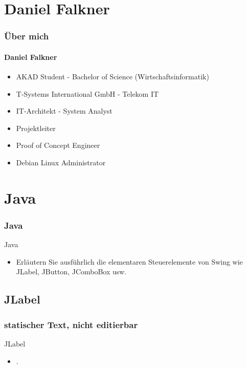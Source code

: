 \documentclass[xcolor=dvipsnames]{beamer}
\subtitle{Modul JAV02} %
\institute{AKAD University} %
\title{\Title}
\author{\Author}
\date{05/06.September.2014}
\begin{document}
\begin{frame}
    \titlepage
\end{frame}


\frame{\tableofcontents[hideothersubsections]} 

\section{Daniel Falkner}
\begin{frame} %
  \frametitle{Über mich} %
  \framesubtitle{Daniel Falkner} %
  \begin{block}{}
	  \begin{itemize}
	  	\item AKAD Student - Bachelor of Science (Wirtschaftsinformatik)
  		\item T-Systems International GmbH - Telekom IT
  		\item IT-Architekt - System Analyst
		\item Projektleiter
		\item Proof of Concept Engineer
  		\item Debian Linux Administrator
	  \end{itemize}
  \end{block}
\end{frame}


\section{Java}
\begin{frame} %
  \frametitle{Java} %
  \begin{block}{Java}
	  \begin{itemize}
		\item Erläutern Sie ausführlich die elementaren Steuerelemente von Swing wie JLabel, JButton, JComboBox usw.
	  \end{itemize}
  \end{block}
\end{frame}


\subsection{JLabel}
\begin{frame} %
  \frametitle{statischer Text, nicht editierbar} %
  \begin{block}{JLabel}
	  \begin{itemize}
		\item .
	  \end{itemize}
  \end{block}
\end{frame}
\end{document}
